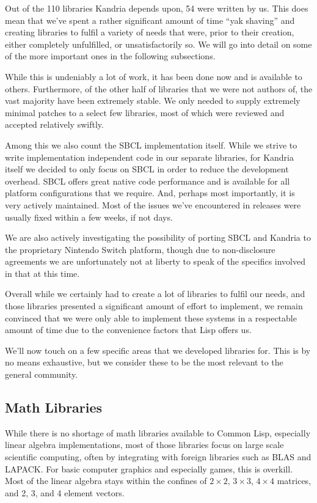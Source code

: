 \documentclass[format=sigconf]{acmart}
\begin{document}
Out of the 110 libraries Kandria depends upon, 54 were written by us. This does mean that we've spent a rather significant amount of time ``yak shaving'' and creating libraries to fulfil a variety of needs that were, prior to their creation, either completely unfulfilled, or unsatisfactorily so. We will go into detail on some of the more important ones in the following subsections.

While this is undeniably a lot of work, it has been done now and is available to others. Furthermore, of the other half of libraries that we were not authors of, the vast majority have been extremely stable. We only needed to supply extremely minimal patches to a select few libraries, most of which were reviewed and accepted relatively swiftly.

Among this we also count the SBCL implementation itself. While we strive to write implementation independent code in our separate libraries, for Kandria itself we decided to only focus on SBCL in order to reduce the development overhead. SBCL offers great native code performance and is available for all platform configurations that we require. And, perhaps most importantly, it is very actively maintained. Most of the issues we've encountered in releases were usually fixed within a few weeks, if not days.

We are also actively investigating the possibility of porting SBCL and Kandria to the proprietary Nintendo Switch platform, though due to non-disclosure agreements we are unfortunately not at liberty to speak of the specifics involved in that at this time.

Overall while we certainly had to create a lot of libraries to fulfil our needs, and those libraries presented a significant amount of effort to implement, we remain convinced that we were only able to implement these systems in a respectable amount of time due to the convenience factors that Lisp offers us.

We'll now touch on a few specific areas that we developed libraries for. This is by no means exhaustive, but we consider these to be the most relevant to the general community.

\subsection{Math Libraries}\label{math}
While there is no shortage of math libraries available to Common Lisp, especially linear algebra implementations, most of those libraries focus on large scale scientific computing, often by integrating with foreign libraries such as BLAS and LAPACK. For basic computer graphics and especially games, this is overkill. Most of the linear algebra stays within the confines of $2\times 2$, $3\times 3$, $4\times 4$ matrices, and 2, 3, and 4 element vectors.
\end{document}
